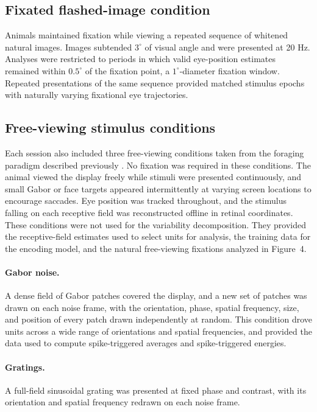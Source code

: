 \documentclass{lite}
\begin{document}
\subsection{Fixated flashed-image condition}

Animals maintained fixation while viewing a repeated sequence of whitened natural images. Images subtended $3^\circ$ of visual angle and were presented at 20 Hz. Analyses were restricted to periods in which valid eye-position estimates remained within $0.5^\circ$ of the fixation point, a $1^\circ$-diameter fixation window. Repeated presentations of the same sequence provided matched stimulus epochs with naturally varying fixational eye trajectories.

\subsection{Free-viewing stimulus conditions}

Each session also included three free-viewing conditions taken from the foraging
paradigm described previously \cite{yates2023detailed}. No fixation was required in
these conditions. The animal viewed the display freely while stimuli were
presented continuously, and small Gabor or face targets appeared intermittently at
varying screen locations to encourage saccades. Eye position was tracked
throughout, and the stimulus falling on each receptive field was reconstructed
offline in retinal coordinates. These conditions were not used for the
variability decomposition. They provided the receptive-field estimates used to
select units for analysis, the training data for the encoding model, and the natural
free-viewing fixations analyzed in Figure~4.

\paragraph{Gabor noise.} A dense field of Gabor patches covered the display, and a
new set of patches was drawn on each noise frame, with the orientation, phase,
spatial frequency, size, and position of every patch drawn independently at random.
This condition drove units across a wide range of orientations and spatial
frequencies, and provided the data used to compute spike-triggered averages and
spike-triggered energies.

\paragraph{Gratings.} A full-field sinusoidal grating was presented at fixed phase and
contrast, with its orientation and spatial frequency redrawn on each noise frame.
\end{document}
